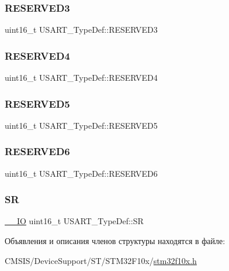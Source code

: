 \subsubsection{\texorpdfstring{RESERVED3}{RESERVED3}}
{\footnotesize\ttfamily uint16\+\_\+t U\+S\+A\+R\+T\+\_\+\+Type\+Def\+::\+R\+E\+S\+E\+R\+V\+E\+D3}

\mbox{\label{struct_u_s_a_r_t___type_def_a6ac527c7428ad8807a7740c1f33f0351}} 
\subsubsection{\texorpdfstring{RESERVED4}{RESERVED4}}
{\footnotesize\ttfamily uint16\+\_\+t U\+S\+A\+R\+T\+\_\+\+Type\+Def\+::\+R\+E\+S\+E\+R\+V\+E\+D4}

\mbox{\label{struct_u_s_a_r_t___type_def_aa893512291681dfbecc5baa899cfafbf}} 
\subsubsection{\texorpdfstring{RESERVED5}{RESERVED5}}
{\footnotesize\ttfamily uint16\+\_\+t U\+S\+A\+R\+T\+\_\+\+Type\+Def\+::\+R\+E\+S\+E\+R\+V\+E\+D5}

\mbox{\label{struct_u_s_a_r_t___type_def_acd89bb1cba0381c2be8a551e6d14e9f7}} 
\subsubsection{\texorpdfstring{RESERVED6}{RESERVED6}}
{\footnotesize\ttfamily uint16\+\_\+t U\+S\+A\+R\+T\+\_\+\+Type\+Def\+::\+R\+E\+S\+E\+R\+V\+E\+D6}

\mbox{\label{struct_u_s_a_r_t___type_def_a3f1fd9f0c004d3087caeba4815faa41c}} 
\subsubsection{\texorpdfstring{SR}{SR}}
{\footnotesize\ttfamily \mbox{\hyperlink{group___c_m_s_i_s___c_m3__core__definitions_gaec43007d9998a0a0e01faede4133d6be}{\+\_\+\+\_\+\+IO}} uint16\+\_\+t U\+S\+A\+R\+T\+\_\+\+Type\+Def\+::\+SR}



Объявления и описания членов структуры находятся в файле\+:\begin{DoxyCompactItemize}
\item 
C\+M\+S\+I\+S/\+Device\+Support/\+S\+T/\+S\+T\+M32\+F10x/\mbox{\hyperlink{stm32f10x_8h}{stm32f10x.\+h}}\end{DoxyCompactItemize}
